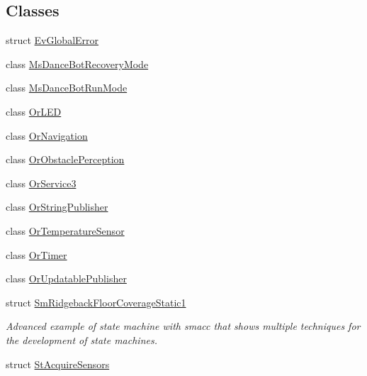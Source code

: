\subsection*{Classes}
\begin{DoxyCompactItemize}
\item 
struct \hyperlink{structsm__ridgeback__floor__coverage__static__1_1_1EvGlobalError}{Ev\+Global\+Error}
\item 
class \hyperlink{classsm__ridgeback__floor__coverage__static__1_1_1MsDanceBotRecoveryMode}{Ms\+Dance\+Bot\+Recovery\+Mode}
\item 
class \hyperlink{classsm__ridgeback__floor__coverage__static__1_1_1MsDanceBotRunMode}{Ms\+Dance\+Bot\+Run\+Mode}
\item 
class \hyperlink{classsm__ridgeback__floor__coverage__static__1_1_1OrLED}{Or\+L\+ED}
\item 
class \hyperlink{classsm__ridgeback__floor__coverage__static__1_1_1OrNavigation}{Or\+Navigation}
\item 
class \hyperlink{classsm__ridgeback__floor__coverage__static__1_1_1OrObstaclePerception}{Or\+Obstacle\+Perception}
\item 
class \hyperlink{classsm__ridgeback__floor__coverage__static__1_1_1OrService3}{Or\+Service3}
\item 
class \hyperlink{classsm__ridgeback__floor__coverage__static__1_1_1OrStringPublisher}{Or\+String\+Publisher}
\item 
class \hyperlink{classsm__ridgeback__floor__coverage__static__1_1_1OrTemperatureSensor}{Or\+Temperature\+Sensor}
\item 
class \hyperlink{classsm__ridgeback__floor__coverage__static__1_1_1OrTimer}{Or\+Timer}
\item 
class \hyperlink{classsm__ridgeback__floor__coverage__static__1_1_1OrUpdatablePublisher}{Or\+Updatable\+Publisher}
\item 
struct \hyperlink{structsm__ridgeback__floor__coverage__static__1_1_1SmRidgebackFloorCoverageStatic1}{Sm\+Ridgeback\+Floor\+Coverage\+Static1}
\begin{DoxyCompactList}\small\item\em Advanced example of state machine with smacc that shows multiple techniques for the development of state machines. \end{DoxyCompactList}\item 
struct \hyperlink{structsm__ridgeback__floor__coverage__static__1_1_1StAcquireSensors}{St\+Acquire\+Sensors}
\item 

\end{DoxyCompactItemize}
